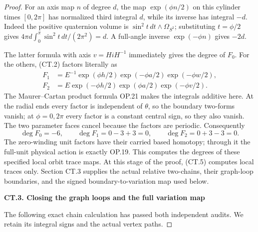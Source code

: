 \begin{proof}
For an axis map \(n\) of degree \(d\), the map
\(\exp(\phi n/2)\) on this cylinder times \([0,2\pi]\) has
normalized third integral \(d\), while its inverse has integral
\(-d\). Indeed the positive quaternion volume is
\(\sin^2 t\,dt\wedge\Omega_{S^2}\); substituting
\(t=\phi/2\) gives
\(4\pi d\int_0^\pi\sin^2t\,dt/(2\pi^2)=d\).
A full-angle inverse \(\exp(-\phi n)\) gives \(-2d\).

The latter formula with axis \(v=HiH^{-1}\) immediately gives the degree of \(F_0\).
For the others, (CT.2) factors literally as
\[
 \begin{aligned}
 F_1&=E^{-1}\exp(\phi h/2)
                  \exp(-\phi a/2)\exp(-\phi w/2),\\
 F_2&=E\exp(-\phi h/2)
                  \exp(\phi a/2)\exp(-\phi v/2).
 \end{aligned}                                           \tag{CT.4}
\]
The Maurer--Cartan product formula OP.21 makes the integrals additive
here. At the radial ends every factor is independent of \(\theta\),
so the boundary two-forms vanish; at \(\phi=0,2\pi\) every factor
is a constant central sign, so they also vanish. The two parameter
faces cancel because the factors are periodic. Consequently
\[
               \deg F_0=-6,\qquad
               \deg F_1=0-3+3=0,\qquad
               \deg F_2=0+3-3=0.                    \tag{CT.5}
\]
The zero-winding unit factors have their carried based homotopy;
through it the full-unit physical action is exactly OP.19. This
computes the degrees of these specified local orbit trace maps.
At this stage of the proof, (CT.5) computes local traces only.
Section CT.3 supplies the actual relative two-chains, their graph-loop
boundaries, and the signed boundary-to-variation map used below.

\par

\medskip\noindent\textbf{CT.3. Closing the graph loops and the full variation map}

\par\nobreak

The following exact chain calculation has passed both independent
audits. We retain its integral signs and the actual vertex paths.


\end{proof}
